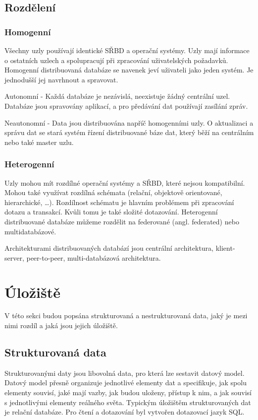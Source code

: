 \subsection{Rozdělení}
\subsubsection{Homogenní}
Všechny uzly používají identické SŘBD a operační systémy. Uzly mají informace o ostatních uzlech a spolupracují při zpracování uživatelských požadavků. Homogenní distribuovaná databáze se navenek jeví uživateli jako jeden systém. Je jednodušší jej navrhnout a spravovat.

\vspace{0.5cm}
\noindent Autonomní - Každá databáze je nezávislá, neexistuje žádný centrální uzel. Databáze jsou spravovány aplikací, a pro předávání dat používají zasílání zpráv.

\vspace{0.5cm}
\noindent Neautonomní - Data jsou distribuována napříč homogenními uzly. O aktualizaci a správu dat se stará systém řízení distribuované báze dat, který běží na centrálním nebo také master uzlu.

\subsubsection{Heterogenní}
Uzly mohou mít rozdílné operační systémy a SŘBD, které nejsou kompatibilní. Mohou také využívat rozdílná schémata (relační, objektově orientované, hierarchické, \ldots). Rozdílnost schématu je hlavním problémem při zpracování dotazu a transakcí. Kvůli tomu je také složité dotazování. \cite{wikiDBMS} Heterogenní distribuované databáze můžeme rozdělit na federované (angl. federated) nebo multidatabázové.

\vspace{0.5cm}
\noindent Architekturami distribuovaných databází jsou centrální architektura, klient-server, peer-to-peer, multi-databázová architektura.

\section{Úložiště}
V této sekci budou popsána strukturovaná a nestrukturovaná data, jaký je mezi nimi rozdíl a jaká jsou jejich úložiště.

\subsection{Strukturovaná data}
Strukturovanými daty jsou libovolná data, pro která lze sestavit datový model. Datový model přesně organizuje jednotlivé elementy dat a specifikuje, jak spolu elementy souvisí, jaké mají vazby, jak budou uloženy, přístup k nim, a jak souvisí s jednotlivými elementy reálného světa. \cite{structData} Typickým úložištěm strukturovaných dat je relační databáze. Pro čtení a dotazování byl vytvořen dotazovací jazyk SQL.


